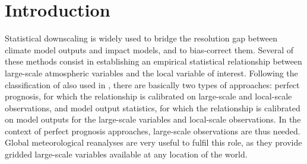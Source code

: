 \documentclass{ametsoc}
\begin{document}






\section{Introduction}

Statistical downscaling is widely used to bridge the resolution gap between climate model outputs and impact models, and to bias-correct them. Several of these methods consist in establishing an empirical statistical relationship between large-scale atmospheric variables and the local variable of interest. Following the classification of \citet{Rummukainen1997} also used in \citet{Maraun2010}, there are basically two types of approaches: perfect prognosis, for which the relationship is calibrated on large-scale and local-scale observations, and model output statistics, for which the relationship is calibrated on model outputs for the large-scale variables and local-scale observations. In the context of perfect prognosis approaches, large-scale observations are thus needed. Global meteorological reanalyses are very useful to fulfil this role, as they provide gridded large-scale variables available at any location of the world.
\end{document}
